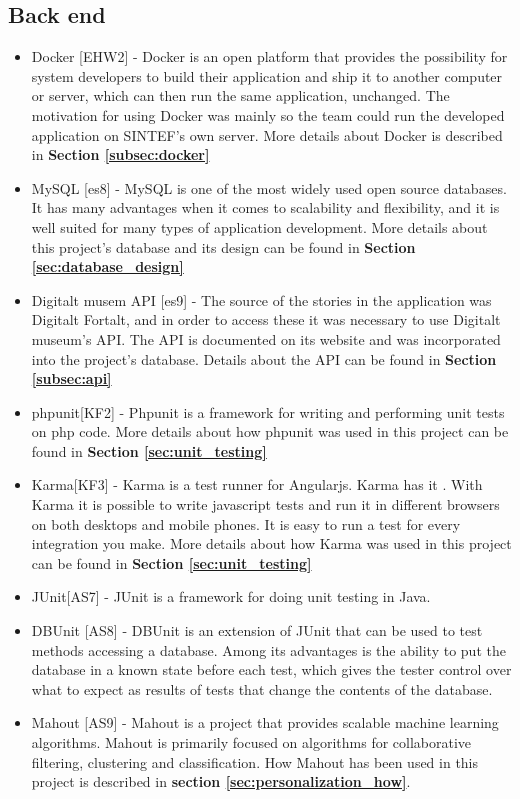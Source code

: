 \subsection{Back end}
\begin{itemize}
	\item Docker [EHW2] - Docker is an open platform that provides the possibility for system developers to build their application and ship it to another computer or server, which can then run the same application, unchanged. The motivation for using Docker was mainly so the team could run the developed application on SINTEF’s own server. More details about Docker is described in \textbf{Section \ref{subsec:docker}}
	\item MySQL [es8] - MySQL is one of the most widely used open source databases. It has many advantages when it comes to scalability and flexibility, and it is well suited for many types of application development. More details about this project’s database and its design can be found in \textbf{Section \ref{sec:database_design}}
	\item Digitalt musem API [es9] - The source of the stories in the application was Digitalt Fortalt, and in order to access these it was necessary to use Digitalt museum’s API. The API is documented on its website and was incorporated into the project’s database. Details about the API can be found in \textbf{Section \ref{subsec:api}}
	\item phpunit[KF2] - Phpunit is a framework for writing and performing unit tests on php code. More details about how phpunit was used in this project can be found in \textbf{Section \ref{sec:unit_testing}}
	\item Karma[KF3] - Karma is a test runner for Angularjs. Karma has it . With Karma it is possible to write javascript tests and run it in different browsers on both desktops and mobile phones. It is easy to run a test for every integration you make. More details about how Karma was used in this project can be found in \textbf{Section \ref{sec:unit_testing}}
	\item JUnit[AS7] - JUnit is a framework for doing unit testing in Java. 
	\item DBUnit [AS8] - DBUnit is an extension of JUnit that can be used to test methods accessing a database. Among its advantages is the ability to put the database in a known state before each test, which gives the tester control over what to expect as results of tests that change the contents of the database.
	\item Mahout [AS9] - Mahout is a project that provides scalable machine learning algorithms. Mahout is primarily focused on algorithms for collaborative filtering, clustering and classification. How Mahout has been used in this project is described in \textbf{section \ref{sec:personalization_how}}.
\end{itemize}

